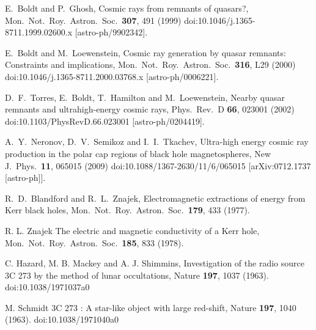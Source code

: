 \documentclass[aps,prd,twocolumn,superscriptaddress,tightenlines,nofootinbib]{revtex4-1}
\begin{document}
\begin{thebibliography}{99}
  E.~Boldt and P.~Ghosh,
  {\color{rossoCP3} Cosmic rays from remnants of quasars?},
  Mon.\ Not.\ Roy.\ Astron.\ Soc.\  {\bf 307}, 491 (1999)
  doi:10.1046/j.1365-8711.1999.02600.x
  [astro-ph/9902342].


  E.~Boldt and M.~Loewenstein,
  {\color{rossoCP3} Cosmic ray generation by quasar remnants: Constraints and implications},
  Mon.\ Not.\ Roy.\ Astron.\ Soc.\  {\bf 316}, L29 (2000)
  doi:10.1046/j.1365-8711.2000.03768.x
  [astro-ph/0006221].



  D.~F.~Torres, E.~Boldt, T.~Hamilton and M.~Loewenstein,
  {\color{rossoCP3} Nearby quasar remnants and ultrahigh-energy cosmic rays},
  Phys.\ Rev.\ D {\bf 66}, 023001 (2002)
  doi:10.1103/PhysRevD.66.023001
  [astro-ph/0204419].


  A.~Y.~Neronov, D.~V.~Semikoz and I.~I.~Tkachev,
 {\color{rossoCP3} Ultra-high energy cosmic ray production in the polar cap regions of black hole magnetospheres},
  New J.\ Phys.\  {\bf 11}, 065015 (2009)
  doi:10.1088/1367-2630/11/6/065015
  [arXiv:0712.1737 [astro-ph]].


  R.~D.~Blandford and R.~L.~Znajek,
   {\color{rossoCP3} Electromagnetic extractions of energy from Kerr black holes},
  Mon.\ Not.\ Roy.\ Astron.\ Soc.\  {\bf 179}, 433 (1977).


 R. L. Znajek
 {\color{rossoCP3} The electric and magnetic conductivity of a Kerr  hole},
 Mon.\ Not.\ Roy.\ Astron.\ Soc.\  {\bf 185}, 833 (1978).


C. Hazard, M. B. Mackey and A. J. Shimmins,
{\color{rossoCP3} Investigation of the radio source 3C 273 by the method of lunar occultations},
Nature {\bf 197},  1037 (1963).
doi:10.1038/1971037a0

 M. Schmidt {\color{rossoCP3} 3C 273 : A star-like
  object with large red-shift},
Nature {\bf 197}, 1040 (1963).
doi:10.1038/1971040a0


\end{thebibliography}
\end{document}
